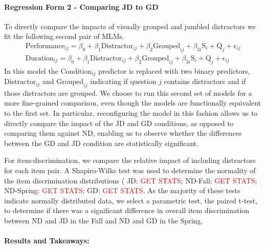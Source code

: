 \documentclass[authorversion,nonacm]{acmart}
\begin{document}
\noindent\paragraph{Regression Form 2 - Comparing JD to GD}
To directly compare the impacts of visually grouped and jumbled distractors we fit 
the following second pair of MLMs.
\begin{align*}
  \text{Performance}_{ij} = \beta_0 + \beta_1\text{Distractor}_{ij} + \beta_2\text{Grouped}_{ij} + \beta_{3i}\text{S}_{i} + \text{Q}_{j} + \epsilon_{ij}\\
  \text{Duration}_{ij} = \beta_0 + \beta_1\text{Distractor}_{ij} + \beta_2\text{Grouped}_{ij} + \beta_{3i}\text{S}_{i} + \text{Q}_{j} + \epsilon_{ij} 
\end{align*}
In this model the $\text{Condition}_{ij}$ predictor is replaced with two binary
predictors, $\text{Distractor}_{ij}$ and $\text{Grouped}_{ij}$  indicating if
question $j$ contains distractors and if those distractors are grouped. We
choose to run this second set of models for a more fine-grained comparison,
even though the models are functionally equivalent to the first set. In
particular, reconfiguring the model in this fashion allows us to directly
compare the impact of the JD and GD conditions, as opposed to comparing them
against ND, enabling us to observe whether the differences between the GD and
JD condition are statistically significant. 

For item-discrimination, we compare the relative impact of including
distractors for each item pair. A Shapiro-Wilks test was used to determine the
normality of the item discrimination distributions ( JD: \textcolor{red}{GET
STATS}; ND-Fall: \textcolor{red}{GET STATS}; ND-Spring: \textcolor{red}{GET
STATS}; GD: \textcolor{red}{GET STATS}.  As the majority of these tests
indicate normally distributed data, we select a parametric test, the paired
t-test, to determine if there was a significant difference in overall item
discrimination between ND and JD in the Fall and ND and GD in the Spring.  

\paragraph{Results and Takeaways:}
\end{document}
